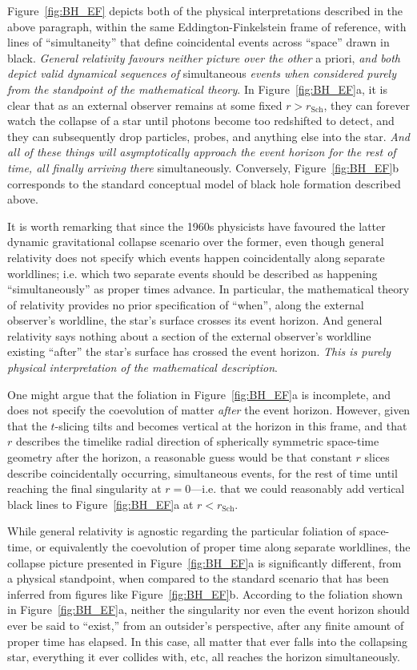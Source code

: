 \documentclass[aps,rmp,groupedaddress,twocolumn,10pt]{revtex4-2}
\begin{document}
Figure~\ref{fig:BH_EF} depicts both of the physical interpretations described in the above paragraph, within the same Eddington-Finkelstein frame of reference, with lines of ``simultaneity'' that define coincidental events across ``space'' drawn in black. \textit{General relativity favours neither picture over the other} a priori, \textit{and both depict valid dynamical sequences of} simultaneous \textit{events when considered purely from the standpoint of the mathematical theory}. In Figure~\ref{fig:BH_EF}a, it is clear that as an external observer remains at some fixed $r>r_{\mathrm{Sch}}$, they can forever watch the collapse of a star until photons become too redshifted to detect, and they can subsequently drop particles, probes, and anything else into the star. \textit{And all of these things will asymptotically approach the event horizon for the rest of time, all finally arriving there} simultaneously. Conversely, Figure~\ref{fig:BH_EF}b corresponds to the standard conceptual model of black hole formation described above.

It is worth remarking that since the 1960s physicists have favoured the latter dynamic gravitational collapse scenario over the former, even though general relativity does not specify which events happen coincidentally along separate worldlines; i.e. which two separate events should be described as happening ``simultaneously'' as proper times advance. In particular, the mathematical theory of relativity provides no prior specification of ``when'', along the external observer's worldline, the star's surface crosses its event horizon. And general relativity says nothing about a section of the external observer's worldline existing ``after'' the star's surface has crossed the event horizon. \textit{This is purely physical interpretation of the mathematical description}. 

One might argue that the foliation in Figure~\ref{fig:BH_EF}a is incomplete, and does not specify the coevolution of matter \textit{after} the event horizon. However, given that the $t$-slicing tilts and becomes vertical at the horizon in this frame, and that $r$ describes the timelike radial direction of spherically symmetric space-time geometry after the horizon, a reasonable guess would be that constant $r$ slices describe coincidentally occurring, simultaneous events, for the rest of time until reaching the final singularity at $r=0$---i.e. that we could reasonably add vertical black lines to Figure~\ref{fig:BH_EF}a at $r<r_{\mathrm{Sch}}$.

While general relativity is agnostic regarding the particular foliation of space-time, or equivalently the coevolution of proper time along separate worldlines, the collapse picture presented in Figure~\ref{fig:BH_EF}a is significantly different, from a physical standpoint, when compared to the standard scenario that has been inferred from figures like Figure~\ref{fig:BH_EF}b. According to the foliation shown in Figure~\ref{fig:BH_EF}a, neither the singularity nor even the event horizon should ever be said to ``exist,'' from an outsider's perspective, after any finite amount of proper time has elapsed. In this case, all matter that ever falls into the collapsing star, everything it ever collides with, etc, all reaches the horizon simultaneously. 
\end{document}

